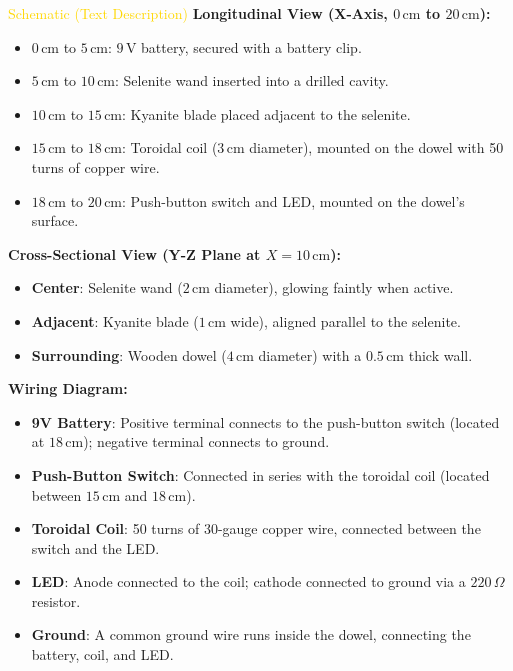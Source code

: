 \textcolor{gold}{ Schematic (Text Description) }
\textbf{Longitudinal View (X-Axis, $0\,\mathrm{cm}$ to $20\,\mathrm{cm}$):}
\begin{itemize}
    \item $0\,\mathrm{cm}$ to $5\,\mathrm{cm}$: $9\,\mathrm{V}$ battery, secured with a battery clip.
    \item $5\,\mathrm{cm}$ to $10\,\mathrm{cm}$: Selenite wand inserted into a drilled cavity.
    \item $10\,\mathrm{cm}$ to $15\,\mathrm{cm}$: Kyanite blade placed adjacent to the selenite.
    \item $15\,\mathrm{cm}$ to $18\,\mathrm{cm}$: Toroidal coil ($3\,\mathrm{cm}$ diameter), mounted on the dowel with 50 turns of copper wire.
    \item $18\,\mathrm{cm}$ to $20\,\mathrm{cm}$: Push-button switch and LED, mounted on the dowel's surface.
\end{itemize}
\textbf{Cross-Sectional View (Y-Z Plane at $X=10\,\mathrm{cm}$):}
\begin{itemize}
    \item \textbf{Center}: Selenite wand ($2\,\mathrm{cm}$ diameter), glowing faintly when active.
    \item \textbf{Adjacent}: Kyanite blade ($1\,\mathrm{cm}$ wide), aligned parallel to the selenite.
    \item \textbf{Surrounding}: Wooden dowel ($4\,\mathrm{cm}$ diameter) with a $0.5\,\mathrm{cm}$ thick wall.
\end{itemize}
\textbf{Wiring Diagram:}
\begin{itemize}
    \item \texttt{} \textbf{9V Battery}: Positive terminal connects to the push-button switch (located at $18\,\mathrm{cm}$); negative terminal connects to ground.
    \item \texttt{} \textbf{Push-Button Switch}: Connected in series with the toroidal coil (located between $15\,\mathrm{cm}$ and $18\,\mathrm{cm}$).
    \item \texttt{} \textbf{Toroidal Coil}: 50 turns of 30-gauge copper wire, connected between the switch and the LED.
    \item \texttt{} \textbf{LED}: Anode connected to the coil; cathode connected to ground via a $220\,\Omega$ resistor.
    \item \texttt{} \textbf{Ground}: A common ground wire runs inside the dowel, connecting the battery, coil, and LED.
\end{itemize}

